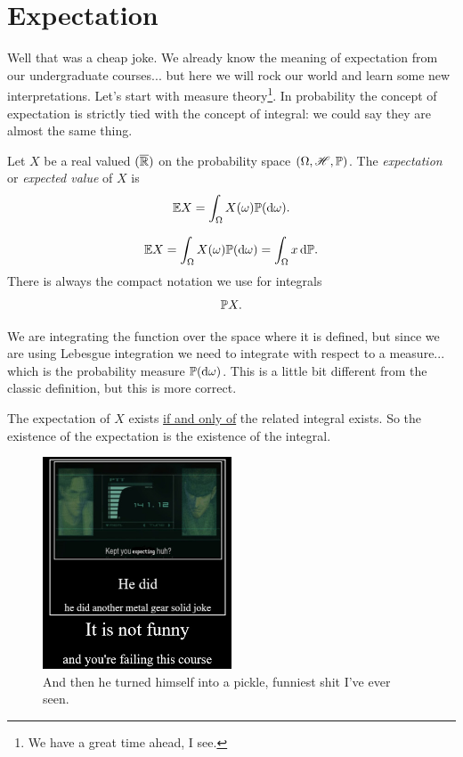 \documentclass{report}
\begin{document}
\section{Expectation}
Well that was a cheap joke. We already know the meaning of expectation from our undergraduate courses... but here we will rock our world and learn some new interpretations. Let's start with measure theory\footnote{We have a great time ahead, I see.}. In probability the concept of expectation is strictly tied with the concept of integral: we could say they are almost the same thing.
\begin{definition}
	Let $X$ be a real valued $(\overline{\mathbb{R}})$ \rv{} on the probability space $(\Omega,\mathscr{H},\mathbb{P})$. The \emph{expectation} or \emph{expected value} of $X$ is
	\[\mathbb{E} X=\int_\Omega X(\omega)\mathbb{P}(\mathop{}\!\mathrm{d}\omega).\]
\end{definition}
	\begin{notation}
		\[\mathbb{E} X=\int_\Omega X(\omega)\mathbb{P}(\mathop{}\!\mathrm{d}\omega)=\int_\Omega x\mathop{}\!\mathrm{d}\mathbb{P}.\]
		There is always the compact notation we use for integrals
		\[\mathbb{P} X.\]
	\end{notation}
We are integrating the function over the space where it is defined, but since we are using Lebesgue integration we need to integrate with respect to a measure... which is the probability measure $\mathbb{P}(\mathop{}\!\mathrm{d}\omega)$. This is a little bit different from the classic definition, but this is more correct.
\begin{remark}
	The expectation of $X$ exists \underline{if and only of} the related integral exists. So the existence of the expectation is the existence of the integral.\\
\end{remark}
\begin{figure}[H]
	\centering
	\includegraphics[width=0.5\textwidth]{kept3}
	\caption{And then he turned himself into a pickle, funniest shit I've ever seen.}
	\label{fig:kept3}
\end{figure}
\end{document}
